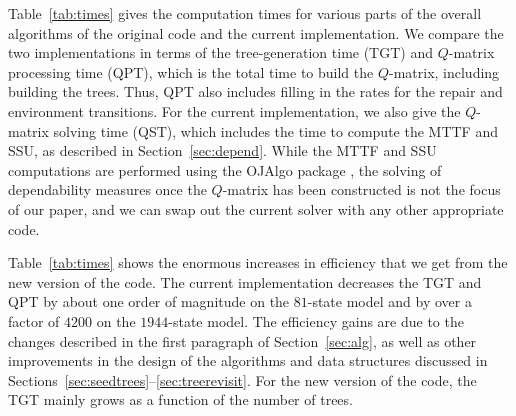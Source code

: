 \documentclass[12pt]{article}
\begin{document}
Table~\ref{tab:times}
gives the computation times for
various parts of the overall algorithms
of the original code \cite{ING:2009}
and the current implementation.
We compare the two implementations in
terms of the tree-generation time (TGT)
and $Q$-matrix processing time (QPT),
which is the total time to build the
$Q$-matrix, including building the trees.
Thus, QPT also includes filling in the
rates for the repair
and environment transitions.
For the current implementation,
we also give the $Q$-matrix solving time
(QST), which includes the time to
compute the MTTF and SSU,
as described
in Section~\ref{sec:depend}.
While the MTTF and SSU computations are performed
using the OJAlgo package \cite{OJAL:2013},
the solving of dependability
measures once the $Q$-matrix has been
constructed is not the focus of our paper,
and we can swap out the current solver
with any other appropriate code.

Table~\ref{tab:times} shows the
enormous increases in efficiency
that we get from the new version
of the code.
The current implementation
decreases the TGT and QPT
by about one order of
magnitude on the $81$-state model
and by over a factor of $4200$
on the $1944$-state model.
The efficiency gains are due to the
changes described
in the first paragraph
of Section~\ref{sec:alg},
as well as other improvements
in the design of the algorithms
and data structures
discussed in
Sections~\ref{sec:seedtrees}--\ref{sec:treerevisit}.
For the new version of the code,
the TGT mainly grows as a function
of the number of trees.



\end{document}

